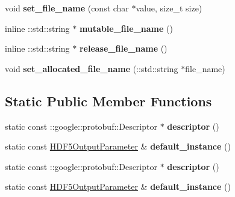 \begin{DoxyCompactItemize}
void {\bfseries set\+\_\+file\+\_\+name} (const char $\ast$value, size\+\_\+t size)
\item 
\mbox{\label{classcaffe_1_1_h_d_f5_output_parameter_a870f4feb05256329802f1a136a3dc1e5}} 
inline \+::std\+::string $\ast$ {\bfseries mutable\+\_\+file\+\_\+name} ()
\item 
\mbox{\label{classcaffe_1_1_h_d_f5_output_parameter_a25250656c838b0c89cdd589af19fa131}} 
inline \+::std\+::string $\ast$ {\bfseries release\+\_\+file\+\_\+name} ()
\item 
\mbox{\label{classcaffe_1_1_h_d_f5_output_parameter_ab2e36acb96886b0f511d91b155186c57}} 
void {\bfseries set\+\_\+allocated\+\_\+file\+\_\+name} (\+::std\+::string $\ast$file\+\_\+name)
\end{DoxyCompactItemize}
\subsection*{Static Public Member Functions}
\begin{DoxyCompactItemize}
\item 
\mbox{\label{classcaffe_1_1_h_d_f5_output_parameter_aadf40a840031075f9de53cf5fcee9634}} 
static const \+::google\+::protobuf\+::\+Descriptor $\ast$ {\bfseries descriptor} ()
\item 
\mbox{\label{classcaffe_1_1_h_d_f5_output_parameter_a6c32d325f5332550b24d85ffae7732cb}} 
static const \mbox{\hyperlink{classcaffe_1_1_h_d_f5_output_parameter}{H\+D\+F5\+Output\+Parameter}} \& {\bfseries default\+\_\+instance} ()
\item 
\mbox{\label{classcaffe_1_1_h_d_f5_output_parameter_a1409687242e32a1c7ac7b33504c5e9a3}} 
static const \+::google\+::protobuf\+::\+Descriptor $\ast$ {\bfseries descriptor} ()
\item 
\mbox{\label{classcaffe_1_1_h_d_f5_output_parameter_aa1bd9169634a55861fbabd7d8c3d6d2f}} 
static const \mbox{\hyperlink{classcaffe_1_1_h_d_f5_output_parameter}{H\+D\+F5\+Output\+Parameter}} \& {\bfseries default\+\_\+instance} ()
\end{DoxyCompactItemize}
